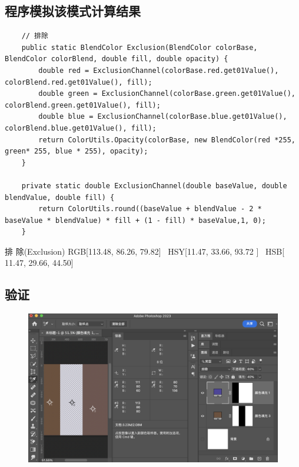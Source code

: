 \subsection{ 程序模拟该模式计算结果}

\begin{lstlisting}
	// 排除
	public static BlendColor Exclusion(BlendColor colorBase, BlendColor colorBlend, double fill, double opacity) {
		double red = ExclusionChannel(colorBase.red.get01Value(), colorBlend.red.get01Value(), fill);
		double green = ExclusionChannel(colorBase.green.get01Value(), colorBlend.green.get01Value(), fill);
		double blue = ExclusionChannel(colorBase.blue.get01Value(), colorBlend.blue.get01Value(), fill);
		return ColorUtils.Opacity(colorBase, new BlendColor(red *255, green* 255, blue * 255), opacity);
	}
	
	private static double ExclusionChannel(double baseValue, double blendValue, double fill) {
		return ColorUtils.round((baseValue + blendValue - 2 * baseValue * blendValue) * fill + (1 - fill) * baseValue,1, 0);
	}
\end{lstlisting}


\begin{result}
\item	排    除(Exclusion)     RGB[113.48,  86.26,  79.82]~ HSY[11.47,  33.66,  93.72 ]~ HSB[ 11.47,  29.66,  44.50]
\end{result}



\subsection{ 验证}
\begin{figure}[h!]
	\centering
	\includegraphics[width=\linewidth]{figure/exclusion}
	\caption{}
	\label{fig:exclusion}
\end{figure}
%
%
%
\newpage
